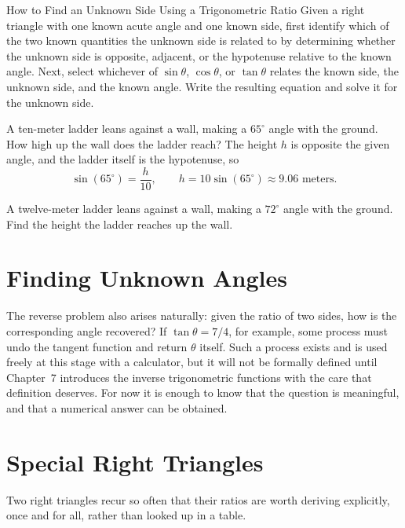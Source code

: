 \begin{algorithmproc}{How to Find an Unknown Side Using a Trigonometric Ratio}
Given a right triangle with one known acute angle and one known side, first
identify which of the two known quantities the unknown side is related to
by determining whether the unknown side is opposite, adjacent, or the
hypotenuse relative to the known angle. Next, select whichever of
$\sin\theta$, $\cos\theta$, or $\tan\theta$ relates the known side, the
unknown side, and the known angle. Write the resulting equation and solve it
for the unknown side.
\end{algorithmproc}

\begin{example}
A ten-meter ladder leans against a wall, making a $65^\circ$ angle with the
ground. How high up the wall does the ladder reach? The height $h$ is
opposite the given angle, and the ladder itself is the hypotenuse, so
\[
\sin(65^\circ) = \frac{h}{10}, \qquad h = 10\sin(65^\circ) \approx 9.06
\text{ meters.}
\]
\end{example}

\begin{practicenow}
A twelve-meter ladder leans against a wall, making a $72^\circ$ angle with
the ground. Find the height the ladder reaches up the wall.
\end{practicenow}

\section{Finding Unknown Angles}

The reverse problem also arises naturally: given the ratio of two sides, how
is the corresponding angle recovered? If $\tan\theta = 7/4$, for example,
some process must undo the tangent function and return $\theta$ itself. Such
a process exists and is used freely at this stage with a calculator, but it
will not be formally defined until Chapter~7 introduces the inverse
trigonometric functions with the care that definition deserves. For now it
is enough to know that the question is meaningful, and that a numerical
answer can be obtained.

\section{Special Right Triangles}

Two right triangles recur so often that their ratios are worth deriving
explicitly, once and for all, rather than looked up in a table.

